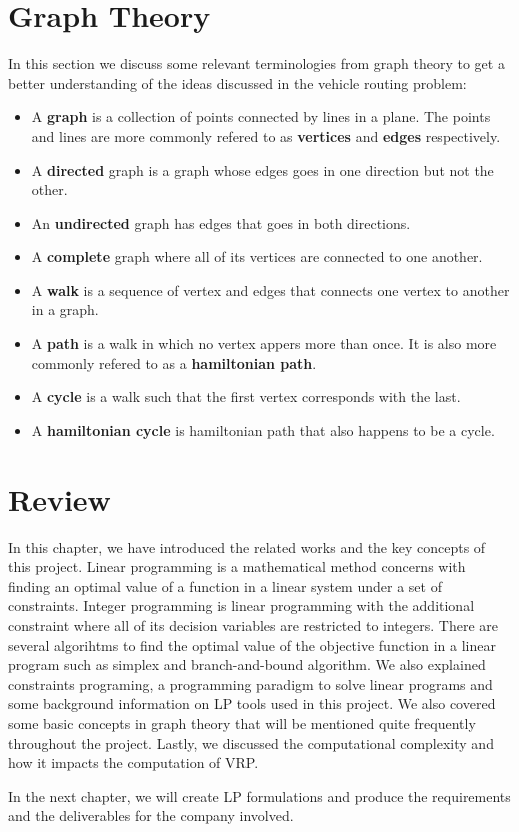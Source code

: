 \section{Graph Theory}
In this section we discuss some relevant terminologies \cite{wilson1996} from graph theory to get a better understanding of
the ideas discussed in the vehicle routing problem:
\begin{itemize}
\item A \textbf{graph} is a collection of points connected by lines in a plane. The points and lines are
more commonly refered to as \textbf{vertices} and \textbf{edges} respectively.
\item A \textbf{directed} graph is a graph whose edges goes in one direction but not the other.
\item An \textbf{undirected} graph has edges that goes in both directions.
\item A \textbf{complete} graph where all of its vertices are connected to one another.
\item A \textbf{walk} is a sequence of vertex and edges that connects one vertex to another in a graph.
\item A \textbf{path} is a walk in which no vertex appers more than once. It is also more commonly refered to as a \textbf{hamiltonian path}.
\item A \textbf{cycle} is a walk such that the first vertex corresponds with the last.
\item A \textbf{hamiltonian cycle} is hamiltonian path that also happens to be a cycle.
\end{itemize}

\section{Review}
In this chapter, we have introduced the related works and the key concepts of this project. Linear programming is a
mathematical method concerns with finding an optimal value of a function in a linear system under a set of constraints. Integer
programming is linear programming with the additional constraint where all of its decision variables are restricted to integers.
There are several algorihtms to find the optimal value of the objective function in a linear program such as simplex and branch-and-bound
algorithm. We also explained constraints programing, a programming paradigm to solve linear programs and
some background information on LP tools used in this project. We also covered some basic
concepts in graph theory that will be mentioned quite frequently throughout the project. Lastly, we discussed the
computational complexity and how it impacts the computation of VRP.

In the next chapter, we will create LP formulations and produce the requirements and the deliverables for the company involved.